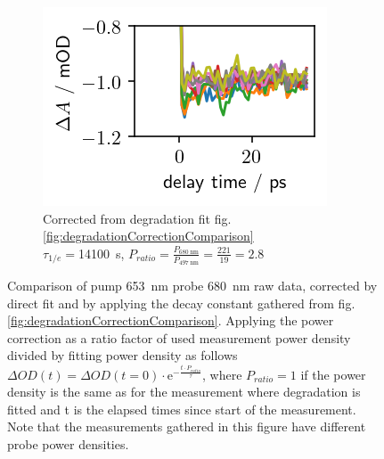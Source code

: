 \documentclass[twoside,openright]{scrreprt}
\begin{document}
{\begin{figure}[hbtp]
\begin{subfigure}[t]{0.3215\linewidth}
\includegraphics[width=\columnwidth]{images/PowerVarHigh_CorrEstimate14100_2.8.png} 
\caption{Corrected from degradation fit fig. \ref{fig:degradationCorrectionComparison}\\
$\tau_{1/e}=$\SI{14100}{\second}, $P_{ratio}=\frac{P_{\SI{680}{\nano\meter}}}{P_{\SI{497}{\nano\meter}}} = \frac{221}{19}= 2.8$}
\end{subfigure}
\caption{Comparison of pump \SI{653}{\nano\meter} probe \SI{680}{\nano\meter} raw data, corrected by direct fit and by applying the decay constant gathered from fig. \ref{fig:degradationCorrectionComparison}. Applying the power correction as a ratio factor of used measurement power density divided by fitting power density as follows $\Delta OD(t) = \Delta OD(t=0)\cdot \mathrm{e}^{-\frac{t\cdot P_{ratio}}{\tau}}$, where $P_{ratio} =1$ if the power density is the same as for the measurement where degradation is fitted and t is the elapsed times since start of the measurement. Note that the measurements gathered in this figure have different probe power densities.\label{fig:powerVarCorrection}}
\end{figure}
}
\end{document}
